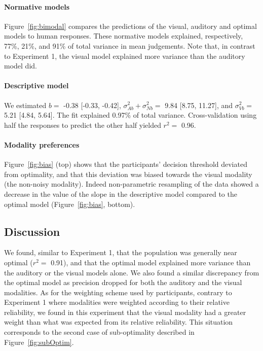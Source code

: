 \documentclass[english,,man,floatsintext]{apa6}
\let\oldparagraph\paragraph
\renewcommand{\paragraph}[1]{\oldparagraph{#1}\mbox{}}
\theoremstyle{definition}
\theoremstyle{definition}
\theoremstyle{definition}
\theoremstyle{remark}
\begin{document}
\paragraph{Normative models}\label{normative-models-1}

Figure~\ref{fig:bimodal} compares the predictions of the visual,
auditory and optimal models to human responses. These normative models
explained, respectively, 77\%, 21\%, and 91\% of total variance in mean
judgements. Note that, in contrast to Experiment 1, the visual model
explained more variance than the auditory model did.

\paragraph{Descriptive model}\label{descriptive-model-1}

We estimated \(b=\) -0.38 {[}-0.33, -0.42{]},
\(\sigma^2_{Ab}+\sigma^2_{Nb}=\) 9.84 {[}8.75, 11.27{]}, and
\(\sigma^2_{Vb}=\) 5.21 {[}4.84, 5.64{]}. The fit explained 0.97\% of
total variance. Cross-validation using half the responses to predict the
other half yielded \(r^2 =\) 0.96.

\paragraph{Modality preferences}\label{modality-preferences}

Figure~\ref{fig:bias} (top) shows that the participants' decision
threshold deviated from optimality, and that this deviation was biased
towards the visual modality (the non-noisy modality). Indeed
non-parametric resampling of the data showed a decrease in the value of
the slope in the descriptive model compared to the optimal model
(Figure~\ref{fig:bias}, bottom).

\subsection{Discussion}\label{discussion-2}

We found, similar to Experiment 1, that the population was generally
near optimal (\(r^2 =\) 0.91), and that the optimal model explained more
variance than the auditory or the visual models alone. We also found a
similar discrepancy from the optimal model as precision dropped for both
the auditory and the visual modalities. As for the weighting scheme used
by participants, contrary to Experiment 1 where modalities were weighted
according to their relative reliability, we found in this experiment
that the visual modality had a greater weight than what was expected
from its relative reliability. This situation corresponds to the second
case of sub-optimality described in Figure~\ref{fig:subOptim}.
\end{document}
